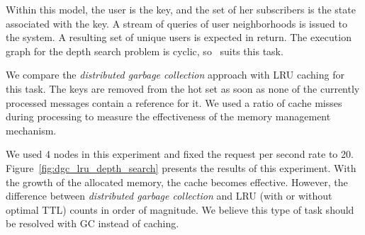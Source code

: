 Within this model, the user is the key, and the set of her subscribers is the state associated with the key. A stream of queries of user neighborhoods is issued to the system. A resulting set of unique users is expected in return. The execution graph for the depth search problem is cyclic, so \tracker\ suits this task. 

We compare the \textit{distributed garbage collection} approach with LRU caching for this task. The keys are removed from the hot set as soon as none of the currently processed messages contain a reference for it. We used a ratio of cache misses during processing to measure the effectiveness of the memory management mechanism. 

We used 4 nodes in this experiment and fixed the request per second rate to 20. Figure~\ref{fig:dgc_lru_depth_search} presents the results of this experiment. With the growth of the allocated memory, the cache becomes effective. However, the difference between 
\textit{distributed garbage collection} and LRU (with or without optimal TTL) counts in order of magnitude. We believe this type of task should be resolved with GC instead of caching.
